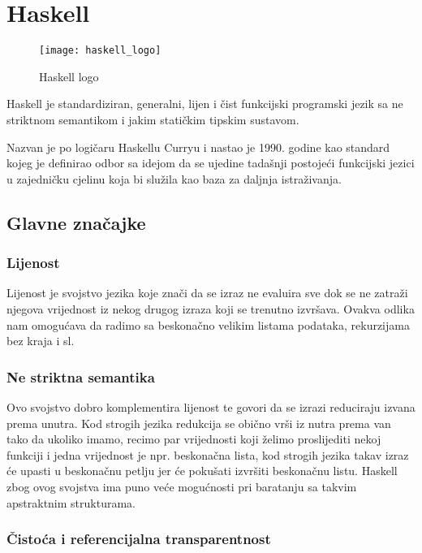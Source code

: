 \chapter{Haskell}

\begin{wrapfigure}[7]{l}{0.25\textwidth}
    \centering
    \texttt{[image: haskell\_logo]}
    \caption{Haskell logo}
    \label{lbl:haskell_logo}
\end{wrapfigure}

Haskell je standardiziran, generalni, lijen i čist funkcijski programski jezik sa ne striktnom semantikom i jakim statičkim tipskim sustavom\cite{haskell_history}.

Nazvan je po logičaru Haskellu Curryu i nastao je 1990. godine kao standard kojeg je definirao odbor sa idejom da se ujedine tadašnji postojeći funkcijski jezici u zajedničku cjelinu koja bi služila kao baza za daljnja istraživanja.

\section{Glavne značajke}

\subsection{Lijenost}

Lijenost je svojstvo jezika koje znači da se izraz ne evaluira sve dok se ne zatraži njegova vrijednost iz nekog drugog izraza koji se trenutno izvršava. Ovakva odlika nam omogućava da radimo sa beskonačno velikim listama podataka, rekurzijama bez kraja i sl.\cite{lazy_vs_nonstrict}

\subsection{Ne striktna semantika}

Ovo svojstvo dobro komplementira lijenost te govori da se izrazi reduciraju izvana prema unutra. Kod strogih jezika redukcija se obično vrši iz nutra prema van tako da ukoliko imamo, recimo par vrijednosti  koji želimo proslijediti nekoj funkciji i jedna vrijednost je npr. beskonačna lista, kod strogih jezika takav izraz će upasti u beskonačnu petlju jer će pokušati izvršiti beskonačnu listu. Haskell zbog ovog svojstva ima puno veće mogućnosti pri baratanju sa takvim apstraktnim strukturama.\cite{lazy_vs_nonstrict}

\subsection{Čistoća i referencijalna transparentnost}
